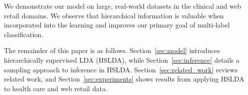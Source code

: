 We demonstrate our model on large, real-world datasets in the clinical and web
retail domains. We observe that hierarchical information is valuable when
incorporated into the learning and improves our primary goal of multi-label
classification. %

The remainder of this paper is as follows. Section~\ref{sec:model}
introduces hierarchically supervised LDA (HSLDA), while
Section~\ref{sec:inference} details a sampling approach to inference in HSLDA. 
Section~\ref{sec:related_work} reviews related work, and
Section~\ref{sec:experiments} shows results from applying HSLDA to health care
and web retail data.  





